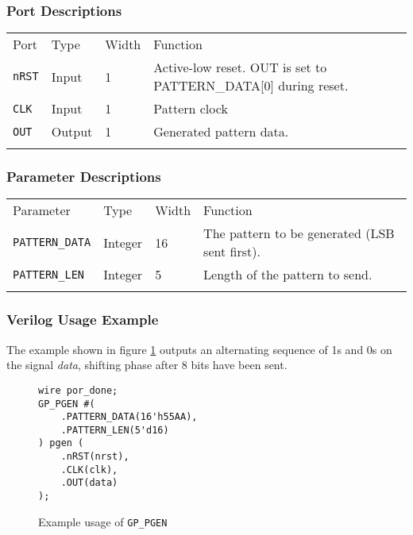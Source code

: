 \documentclass[11pt]{article}
\newcommand{\namestyle}[1]{\textit{#1}}
\newcommand{\tokenstyle}[1]{\texttt{#1}}
\newcommand{\whenstyle}[1]{{\fontseries{sb}\selectfont#1}}
\newcommand{\thinhline}{\Xhline{1\arrayrulewidth}}
\newcommand{\thickhline}{\Xhline{2.5\arrayrulewidth}}
\begin{document}
\subsubsection{Port Descriptions}

\begin{tabularx}{\textwidth}{lllX}
\thinhline
\whenstyle{Port} & \whenstyle{Type} & \whenstyle{Width} & \whenstyle{Function} \\
\thickhline
\tokenstyle{nRST} & Input & 1 & Active-low reset. OUT is set to PATTERN\_DATA[0] during reset.\\
\thinhline
\tokenstyle{CLK} & Input & 1 & Pattern clock\\
\thinhline
\tokenstyle{OUT} & Output & 1 & Generated pattern data.\\
\thinhline
\end{tabularx}

\subsubsection{Parameter Descriptions}

\begin{tabularx}{\textwidth}{lllX}
\thinhline
\whenstyle{Parameter} & \whenstyle{Type} & \whenstyle{Width} & \whenstyle{Function} \\
\thickhline
\tokenstyle{PATTERN\_DATA} & Integer & 16 & The pattern to be generated (LSB sent first). \\
\thinhline
\tokenstyle{PATTERN\_LEN} & Integer & 5 & Length of the pattern to send. \\
\thinhline
\end{tabularx}

\subsubsection{Verilog Usage Example}

The example shown in figure \ref{gp-pgen-example} outputs an alternating sequence of 1s and 0s on the signal
\namestyle{data}, shifting phase after 8 bits have been sent.

\begin{figure}[h]
\begin{lstlisting}
wire por_done;
GP_PGEN #(
	.PATTERN_DATA(16'h55AA),
	.PATTERN_LEN(5'd16)
) pgen (
	.nRST(nrst),
	.CLK(clk),
	.OUT(data)
);
\end{lstlisting}
\caption{Example usage of \tokenstyle{GP\_PGEN}}
\label{gp-pgen-example}
\end{figure}
\end{document}
